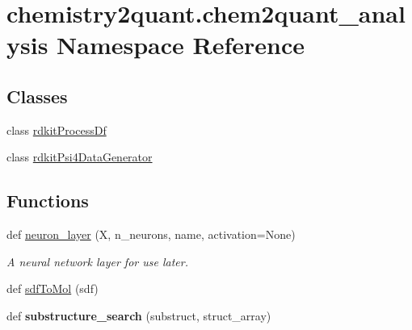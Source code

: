 \hypertarget{namespacechemistry2quant_1_1chem2quant__analysis}{}\section{chemistry2quant.\+chem2quant\+\_\+analysis Namespace Reference}
\label{namespacechemistry2quant_1_1chem2quant__analysis}
\subsection*{Classes}
\begin{DoxyCompactItemize}
\item
class \hyperlink{classchemistry2quant_1_1chem2quant__analysis_1_1rdkitProcessDf}{rdkit\+Process\+Df}
\item
class \hyperlink{classchemistry2quant_1_1chem2quant__analysis_1_1rdkitPsi4DataGenerator}{rdkit\+Psi4\+Data\+Generator}
\end{DoxyCompactItemize}
\subsection*{Functions}
\begin{DoxyCompactItemize}
\item
\mbox{\label{namespacechemistry2quant_1_1chem2quant__analysis_af45b049d6a04c87f9f473f3356dda58c}}
def \hyperlink{namespacechemistry2quant_1_1chem2quant__analysis_af45b049d6a04c87f9f473f3356dda58c}{neuron\+\_\+layer} (X, n\+\_\+neurons, name, activation=None)
\begin{DoxyCompactList}\small\item\em A neural network layer for use later. \end{DoxyCompactList}\item
def \hyperlink{namespacechemistry2quant_1_1chem2quant__analysis_a5c890927e4c20980765efaff0db0c04a}{sdf\+To\+Mol} (sdf)
\item
\mbox{\label{namespacechemistry2quant_1_1chem2quant__analysis_a2707785b7dfd340c999a995b73c2b198}}
def {\bfseries substructure\+\_\+search} (substruct, struct\+\_\+array)
\end{DoxyCompactItemize}
